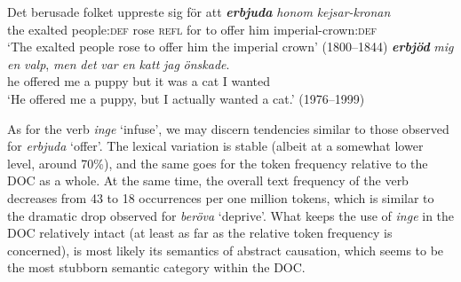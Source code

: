 \documentclass[output=paper]{langscibook}
\begin{document}
\ea \label{ex:valdeson:22}
 \gll Det   berusade   folket       uppreste   sig     för   att \textbf{\textit{erbjuda}} \textit{honom} \textit{kejsar-kronan} \\
    the     exalted     people\textsc{:def}   rose       \textsc{refl} for   to offer               him    imperial-crown:\textsc{def}\\
\glt    ‘The exalted people rose to offer him the imperial crown’ (1800–1844)
\ex \label{ex:valdeson:23}
 \textbf{\textit{erbjöd}} \textit{mig} \textit{en} \textit{valp}, \textit{men} \textit{det} \textit{var} \textit{en} \textit{katt} \textit{jag} \textit{önskade}.\\
  he     offered   me     a   puppy   but       it     was   a   cat   I     wanted\\
\glt `He offered me a puppy, but I actually wanted a cat.’ (1976–1999)
\z


\label{sec:valdeson:5.3.3.3}



As for the verb \textit{inge} ‘infuse’, we may discern tendencies similar to those observed for \textit{erbjuda} ‘offer’. The lexical variation is stable (albeit at a somewhat lower level, around 70\%), and the same goes for the token frequency relative to the DOC as a whole. At the same time, the overall text frequency of the verb decreases from 43 to 18 occurrences per one million tokens, which is similar to the dramatic drop observed for \textit{beröva} ‘deprive’. What keeps the use of \textit{inge} in the DOC relatively intact (at least as far as the relative token frequency is concerned), is most likely its semantics of abstract causation, which seems to be the most stubborn semantic category within the DOC.


\begin{table}
\caption{Frequency measures of the verb-specific DOC with \textit{inge} ‘infuse’}
\label{tab:valdeson:16}
\end{table}
\end{document}
